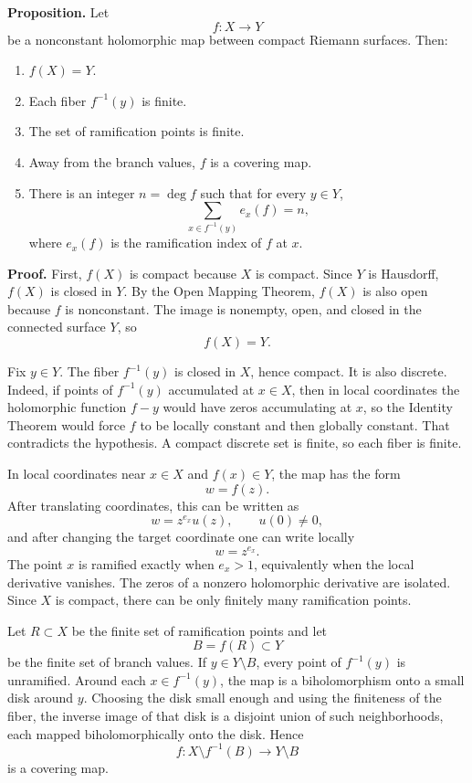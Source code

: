 \documentclass[11pt]{article}
\begin{document}
\textbf{Proposition.}
Let
\[
 f:X\to Y
\]
be a nonconstant holomorphic map between compact Riemann surfaces. Then:
\begin{enumerate}
\item $f(X)=Y$.
\item Each fiber $f^{-1}(y)$ is finite.
\item The set of ramification points is finite.
\item Away from the branch values, $f$ is a covering map.
\item There is an integer $n=\deg f$ such that for every $y\in Y$,
\[
 \sum_{x\in f^{-1}(y)}e_x(f)=n,
\]
where $e_x(f)$ is the ramification index of $f$ at $x$.
\end{enumerate}

\textbf{Proof.}
First, $f(X)$ is compact because $X$ is compact. Since $Y$ is Hausdorff, $f(X)$ is closed in $Y$. By the Open Mapping Theorem, $f(X)$ is also open because $f$ is nonconstant. The image is nonempty, open, and closed in the connected surface $Y$, so
\[
 f(X)=Y.
\]

Fix $y\in Y$. The fiber $f^{-1}(y)$ is closed in $X$, hence compact. It is also discrete. Indeed, if points of $f^{-1}(y)$ accumulated at $x\in X$, then in local coordinates the holomorphic function $f-y$ would have zeros accumulating at $x$, so the Identity Theorem would force $f$ to be locally constant and then globally constant. That contradicts the hypothesis. A compact discrete set is finite, so each fiber is finite.

In local coordinates near $x\in X$ and $f(x)\in Y$, the map has the form
\[
 w=f(z).
\]
After translating coordinates, this can be written as
\[
 w=z^{e_x}u(z),
\qquad u(0)\neq0,
\]
and after changing the target coordinate one can write locally
\[
 w=z^{e_x}.
\]
The point $x$ is ramified exactly when $e_x>1$, equivalently when the local derivative vanishes. The zeros of a nonzero holomorphic derivative are isolated. Since $X$ is compact, there can be only finitely many ramification points.

Let $R\subset X$ be the finite set of ramification points and let
\[
 B=f(R)\subset Y
\]
be the finite set of branch values. If $y\in Y\setminus B$, every point of $f^{-1}(y)$ is unramified. Around each $x\in f^{-1}(y)$, the map is a biholomorphism onto a small disk around $y$. Choosing the disk small enough and using the finiteness of the fiber, the inverse image of that disk is a disjoint union of such neighborhoods, each mapped biholomorphically onto the disk. Hence
\[
 f:X\setminus f^{-1}(B)\to Y\setminus B
\]
is a covering map.
\end{document}
